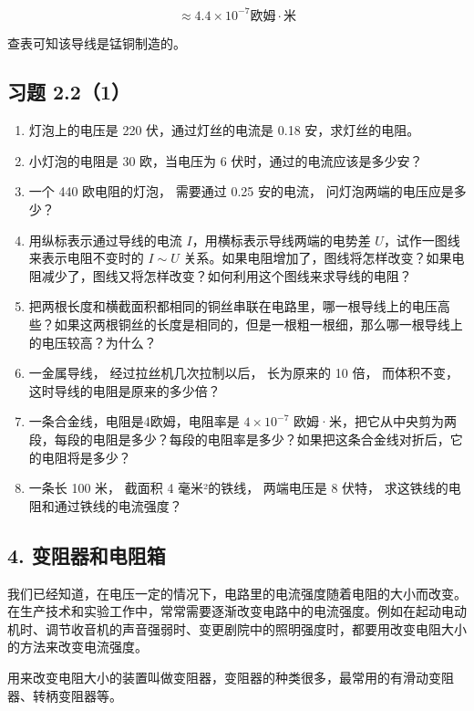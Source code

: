 \[
\approx 4.4 \times 10^{- 7} \text{欧姆} \cdot \text{米}
\]

查表可知该导线是锰铜制造的。

\subsection{习题 2.2（1）}\label{ux4e60ux9898-2.21}

\begin{enumerate}
\def\labelenumi{\arabic{enumi}.}
\item
  灯泡上的电压是 220 伏，通过灯丝的电流是 0.18 安，求灯丝的电阻。
\item
  小灯泡的电阻是 30 欧，当电压为 6 伏时，通过的电流应该是多少安？
\item
  一个 440 欧电阻的灯泡， 需要通过 0.25 安的电流，
  问灯泡两端的电压应是多少？
\item
  用纵标表示通过导线的电流 \(I\)，用横标表示导线两端的电势差
  \(U\)，试作一图线来表示电阻不变时的 \(I \sim U\)
  关系。如果电阻增加了，图线将怎样改变？如果电阻减少了，图线又将怎样改变？如何利用这个图线来求导线的电阻？
\item
  把两根长度和横截面积都相同的铜丝串联在电路里，哪一根导线上的电压高些？如果这两根铜丝的长度是相同的，但是一根粗一根细，那么哪一根导线上的电压较高？为什么？
\item
  一金属导线， 经过拉丝机几次拉制以后， 长为原来的 10 倍， 而体积不变，
  这时导线的电阻是原来的多少倍？
\item
  一条合金线，电阻是4欧姆，电阻率是 \(4\times10^{-7}\)
  欧姆·米，把它从中央剪为两段，每段的电阻是多少？每段的电阻率是多少？如果把这条合金线对折后，它的电阻将是多少？
\item
  一条长 100 米， 截面积 4 毫米²的铁线， 两端电压是 8 伏特，
  求这铁线的电阻和通过铁线的电流强度？
\end{enumerate}

\subsection{4.
变阻器和电阻箱}\label{ux53d8ux963bux5668ux548cux7535ux963bux7bb1}

我们已经知道，在电压一定的情况下，电路里的电流强度随着电阻的大小而改变。在生产技术和实验工作中，常常需要逐渐改变电路中的电流强度。例如在起动电动机时、调节收音机的声音强弱时、变更剧院中的照明强度时，都要用改变电阻大小的方法来改变电流强度。

用来改变电阻大小的装置叫做变阻器，变阻器的种类很多，最常用的有滑动变阻器、转柄变阻器等。

